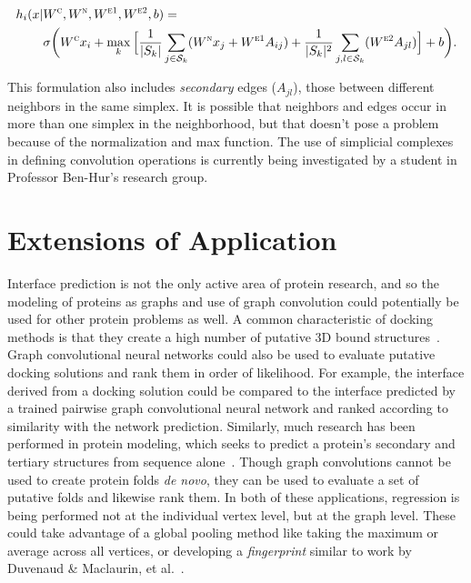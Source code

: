 \begin{equation}
\begin{split}
h_i(x |  & W^{\textsc{c}}, W^{\textsc{n}}, W^{\textsc{e1}}, W^{\textsc{e2}}, b) = \\ 
&\sigma \bigg( W^{\textsc{c}} x_i + \max_{k} \Big[ \frac{1}{|S_k|}  \sum_{j \in \mathcal{S}_k} ( W^{\textsc{n}} x_j + W^{\textsc{e1}} A_{ij} ) + \frac{1}{|S_k|^{2}}\sum_{j, l \in \mathcal{S}_k} (W^{\textsc{e2}} A_{jl}) \Big] + b \bigg).
\end{split}
\label{eq:simplicial_complex_conv}
\end{equation}

\noindent
This formulation also includes \emph{secondary} edges ($A_{jl}$), those between different neighbors in the same simplex.
It is possible that neighbors and edges occur in more than one simplex in the neighborhood, but that doesn't pose a problem because of the normalization and max function.
The use of simplicial complexes in defining convolution operations is currently being investigated by a student in Professor Ben-Hur's research group.


\section{Extensions of Application}

Interface prediction is not the only active area of protein research, and so the modeling of proteins as graphs and use of graph convolution could potentially be used for other protein problems as well.
A common characteristic of docking methods is that they create a high number of putative 3D bound structures~\cite{janin2013}.
Graph convolutional neural networks could also be used to evaluate putative docking solutions and rank them in order of likelihood.
For example, the interface derived from a docking solution could be compared to the interface predicted by a trained pairwise graph convolutional neural network and ranked according to similarity with the network prediction.
Similarly, much research has been performed in protein modeling, which seeks to predict a protein's secondary and tertiary structures from sequence alone~\cite{schwede2013}.
Though graph convolutions cannot be used to create protein folds \emph{de novo}, they can be used to evaluate a set of putative folds and likewise rank them.
In both of these applications, regression is being performed not at the individual vertex level, but at the graph level.
These could take advantage of a global pooling method like taking the maximum or average across all vertices, or developing a \emph{fingerprint} similar to work by Duvenaud \& Maclaurin, et al.~\cite{duvenaud2015}.

